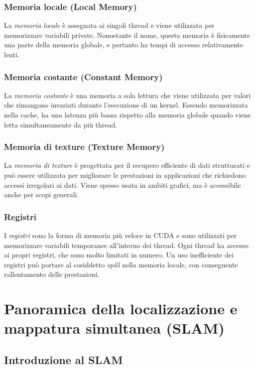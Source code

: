 \documentclass[12pt,a4paper]{report}
\begin{document}
\subsection{Memoria locale (Local Memory)}
La \textit{memoria locale} è assegnata ai singoli thread e viene utilizzata per memorizzare variabili private. Nonostante il nome, questa memoria è fisicamente una parte della memoria globale, e pertanto ha tempi di accesso relativamente lenti.

\subsection{Memoria costante (Constant Memory)}
La \textit{memoria costante} è una memoria a sola lettura che viene utilizzata per valori che rimangono invariati durante l'esecuzione di un kernel. Essendo memorizzata nella cache, ha una latenza più bassa rispetto alla memoria globale quando viene letta simultaneamente da più thread.

\subsection{Memoria di texture (Texture Memory)}
La \textit{memoria di texture} è progettata per il recupero efficiente di dati strutturati e può essere utilizzata per migliorare le prestazioni in applicazioni che richiedono accessi irregolari ai dati. Viene spesso usata in ambiti grafici, ma è accessibile anche per scopi generali.

\subsection{Registri}
I \textit{registri} sono la forma di memoria più veloce in CUDA e sono utilizzati per memorizzare variabili temporanee all'interno dei thread. Ogni thread ha accesso ai propri registri, che sono molto limitati in numero. Un uso inefficiente dei registri può portare al cosiddetto \textit{spill} nella memoria locale, con conseguente rallentamento delle prestazioni.







\chapter{Panoramica della localizzazione e mappatura simultanea (SLAM)}

\section{Introduzione al SLAM}
\end{document}
